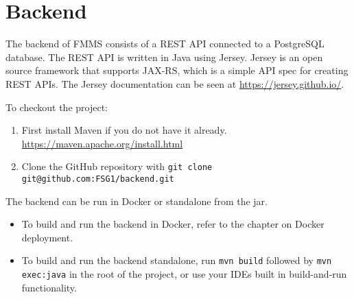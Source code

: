 \chapter{Backend}
	The backend of FMMS consists of a REST API connected to a PostgreSQL database. The REST API is written in Java using Jersey. Jersey is an open source framework that supports JAX-RS, which is a simple API spec for creating REST APIs. The Jersey documentation can be seen at \url{https://jersey.github.io/}.
	
	To checkout the project:
	\begin{enumerate}
		\item First install Maven if you do not have it already. \\ 
		\url{https://maven.apache.org/install.html}
		\item Clone the GitHub repository with \texttt{git clone git@github.com:FSG1/backend.git}
	\end{enumerate}
	
	The backend can be run in Docker or standalone from the jar.
	\begin{itemize}
		\item To build and run the backend in Docker, refer to the chapter on Docker deployment.
		\item To build and run the backend standalone, run \texttt{mvn build} followed by \texttt{mvn exec:java} in the root of the project, or use your IDEs built in build-and-run functionality.	
	\end{itemize}